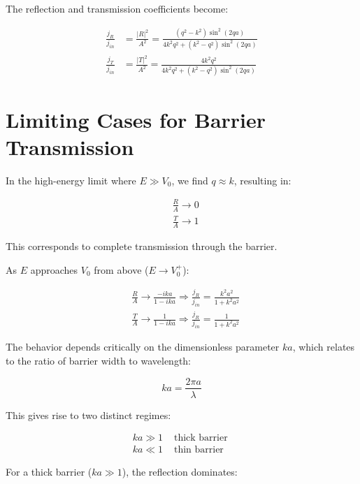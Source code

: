 The reflection and transmission coefficients become:

\begin{align}
\frac{j_{R}}{j_{i n}} & =\frac{|R|^{2}}{A^{2}}=\frac{\left(q^{2}-k^{2}\right) \sin ^{2}(2 q a)}{4 k^{2} q^{2}+\left(k^{2}-q^{2}\right) \sin ^{2}(2 q a)} \\
\frac{j_{T}}{j_{i n}} & =\frac{|T|^{2}}{A^{2}}=\frac{4 k^{2} q^{2}}{4 k^{2} q^{2}+\left(k^{2}-q^{2}\right) \sin ^{2}(2 q a)}
\end{align}

\section{Limiting Cases for Barrier Transmission}

In the high-energy limit where $E \gg V_0$, we find $q \approx k$, resulting in:

\begin{align}
& \frac{R}{A} \rightarrow 0 \\
& \frac{T}{A} \rightarrow 1
\end{align}

This corresponds to complete transmission through the barrier.

As $E$ approaches $V_0$ from above ($E \rightarrow V_0^+$):

\begin{align}
& \frac{R}{A} \rightarrow \frac{-i k a}{1-i k a} \Longrightarrow \frac{j_{R}}{j_{i n}}=\frac{k^{2} a^{2}}{1+k^{2} a^{2}}  \\
& \frac{T}{A} \rightarrow \frac{1}{1-i k a} \Longrightarrow \frac{j_{R}}{j_{i n}}=\frac{1}{1+k^{2} a^{2}}
\end{align}

The behavior depends critically on the dimensionless parameter $ka$, which relates to the ratio of barrier width to wavelength:

\begin{equation}
k a=\frac{2 \pi a}{\lambda}
\end{equation}

This gives rise to two distinct regimes:

\[
\begin{array}{ll}
k a \gg 1 & \text { thick barrier } \\
k a \ll 1 & \text { thin barrier }
\end{array}
\]

For a thick barrier ($ka \gg 1$), the reflection dominates:

